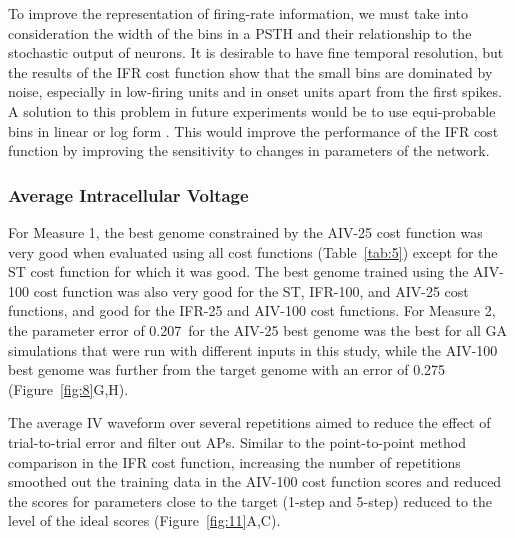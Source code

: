\medskip{}

To improve the representation of firing-rate information, we must take into
consideration the width of the bins in a PSTH and their relationship to the
stochastic output of neurons.  It is desirable to have fine temporal resolution,
but the results of the IFR cost function show that the small bins are dominated
by noise, especially in low-firing units and in onset units apart from the first
spikes. A solution to this problem in future experiments would be to use
equi-probable bins in linear or log form \cite{BhumbraInyushkinEtAl:2004}.  This would improve the
performance of the IFR cost function by improving the sensitivity to changes in
parameters of the network.

\subsubsection{Average Intracellular Voltage}\label{sec:GA:aver-intr-volt-summ}

For Measure 1, the best genome constrained by the AIV-25 cost function was very
good when evaluated using all cost functions (Table~\ref{tab:5}) except for the
ST cost function for which it was good. The best genome trained using the
AIV-100 cost function was also very good for the ST, IFR-100, and AIV-25 cost
functions, and good for the IFR-25 and AIV-100 cost
functions.  %
For Measure 2, the parameter error of 0.207~for the AIV-25 best genome was the
best for all GA simulations that were run with different inputs in this study,
while the AIV-100 best genome was further from the target genome with an error
of 0.275 (Figure~\ref{fig:8}G,H).

\medskip{}
The average IV waveform over several repetitions aimed to reduce the effect of
trial-to-trial error and filter out APs.  Similar to the point-to-point method
comparison in the IFR cost function, increasing the number of repetitions
smoothed out the training data in the AIV-100 cost function scores and reduced
the scores for parameters close to the target (1-step and 5-step) reduced to the
level of the ideal scores (Figure~\ref{fig:11}A,C).

